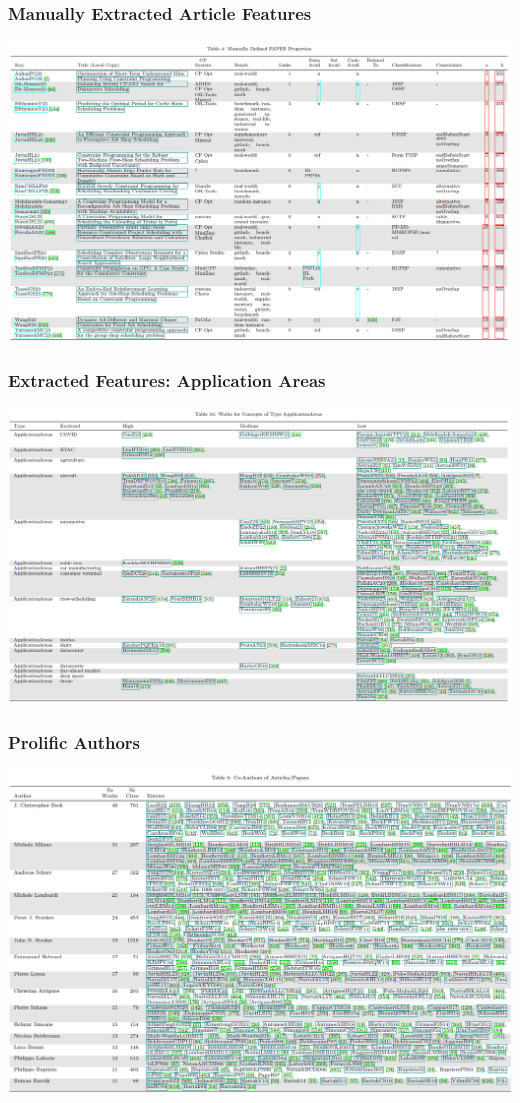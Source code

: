 \begin{frame}
\frametitle{Manually Extracted Article Features}
\includegraphics[width=\textwidth]{survey/manual}
\end{frame}


\begin{frame}
\frametitle{Extracted Features: Application Areas}
\includegraphics[width=\textwidth]{survey/applicationareas}
\end{frame}

\begin{frame}
\frametitle{Prolific Authors}
\includegraphics[width=\textwidth]{survey/authors}
\end{frame}



